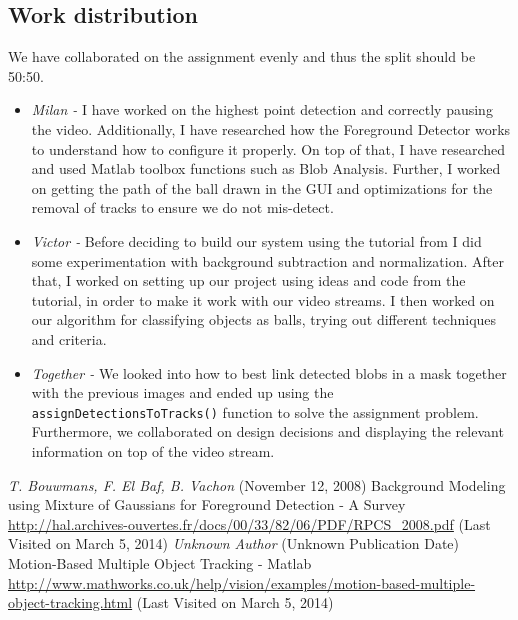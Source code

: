 \documentclass[10pt,a4paper]{article}
\begin{document}
\begin{multicols}{2}
\section{Work distribution}

We have collaborated on the assignment evenly and thus the split should be 50:50.

\begin{itemize}
\item \textit{Milan - } I have worked on the highest point detection and correctly pausing the video. Additionally, I have researched how the Foreground Detector works to understand how to configure it properly. On top of that, I have researched and used Matlab toolbox functions such as Blob Analysis. Further, I worked on getting the path of the ball drawn in the GUI and optimizations for the removal of tracks to ensure we do not mis-detect.
\item \textit{Victor - } Before deciding to build our system using the tutorial from \cite{ES2} I did some experimentation with background subtraction and normalization. After that, I worked on setting up our project using ideas and code from the tutorial, in order to make it work with our video streams. I then worked on our algorithm for classifying objects as balls, trying out different techniques and criteria.
\item \textit{Together - } We looked into how to best link detected blobs in a mask together with the previous images and ended up using the \texttt{assignDetectionsToTracks()} function to solve the assignment problem. Furthermore, we collaborated on design decisions and displaying the relevant information on top of the video stream.
\end{itemize}

\end{multicols}


\begin{thebibliography}{10}
 \textit{T. Bouwmans, F. El Baf, B. Vachon} (November 12, 2008) Background Modeling using Mixture of Gaussians for Foreground Detection - A Survey \url{http://hal.archives-ouvertes.fr/docs/00/33/82/06/PDF/RPCS_2008.pdf} (Last Visited on March 5, 2014)
 \textit{Unknown Author} (Unknown Publication Date) Motion-Based Multiple Object Tracking - Matlab \url{http://www.mathworks.co.uk/help/vision/examples/motion-based-multiple-object-tracking.html} (Last Visited on March 5, 2014)
\end{thebibliography}
\end{document}
